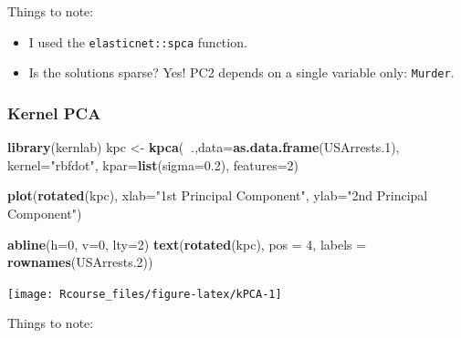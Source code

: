 \documentclass[]{book}
\newenvironment{Shaded}{\begin{snugshade}}{\end{snugshade}}
\newcommand{\DataTypeTok}[1]{\textcolor[rgb]{0.13,0.29,0.53}{#1}}
\newcommand{\DecValTok}[1]{\textcolor[rgb]{0.00,0.00,0.81}{#1}}
\newcommand{\FloatTok}[1]{\textcolor[rgb]{0.00,0.00,0.81}{#1}}
\newcommand{\KeywordTok}[1]{\textcolor[rgb]{0.13,0.29,0.53}{\textbf{#1}}}
\newcommand{\NormalTok}[1]{#1}
\newcommand{\OperatorTok}[1]{\textcolor[rgb]{0.81,0.36,0.00}{\textbf{#1}}}
\newcommand{\StringTok}[1]{\textcolor[rgb]{0.31,0.60,0.02}{#1}}
\providecommand{\tightlist}{%
  \setlength{\itemsep}{0pt}\setlength{\parskip}{0pt}}
\theoremstyle{definition}
\theoremstyle{definition}
\theoremstyle{definition}
\theoremstyle{remark}
\begin{document}
Things to note:

\begin{itemize}
\tightlist
\item
  I used the \texttt{elasticnet::spca} function.
\item
  Is the solutions sparse? Yes! PC2 depends on a single variable only: \texttt{Murder}.
\end{itemize}

\hypertarget{kernel-pca}{%
\subsubsection{Kernel PCA}\label{kernel-pca}}

\begin{Shaded}
\begin{Highlighting}[]
\KeywordTok{library}\NormalTok{(kernlab)}
\NormalTok{kpc <-}\StringTok{ }\KeywordTok{kpca}\NormalTok{(}\OperatorTok{~}\NormalTok{.,}\DataTypeTok{data=}\KeywordTok{as.data.frame}\NormalTok{(USArrests}\FloatTok{.1}\NormalTok{), }\DataTypeTok{kernel=}\StringTok{"rbfdot"}\NormalTok{, }\DataTypeTok{kpar=}\KeywordTok{list}\NormalTok{(}\DataTypeTok{sigma=}\FloatTok{0.2}\NormalTok{), }\DataTypeTok{features=}\DecValTok{2}\NormalTok{)}

\KeywordTok{plot}\NormalTok{(}\KeywordTok{rotated}\NormalTok{(kpc),}
     \DataTypeTok{xlab=}\StringTok{"1st Principal Component"}\NormalTok{,}
     \DataTypeTok{ylab=}\StringTok{"2nd Principal Component"}\NormalTok{)}

\KeywordTok{abline}\NormalTok{(}\DataTypeTok{h=}\DecValTok{0}\NormalTok{, }\DataTypeTok{v=}\DecValTok{0}\NormalTok{, }\DataTypeTok{lty=}\DecValTok{2}\NormalTok{)}
\KeywordTok{text}\NormalTok{(}\KeywordTok{rotated}\NormalTok{(kpc), }\DataTypeTok{pos =} \DecValTok{4}\NormalTok{, }\DataTypeTok{labels =} \KeywordTok{rownames}\NormalTok{(USArrests}\FloatTok{.2}\NormalTok{))}
\end{Highlighting}
\end{Shaded}

\texttt{[image: Rcourse\_files/figure-latex/kPCA-1]}

Things to note:
\end{document}
